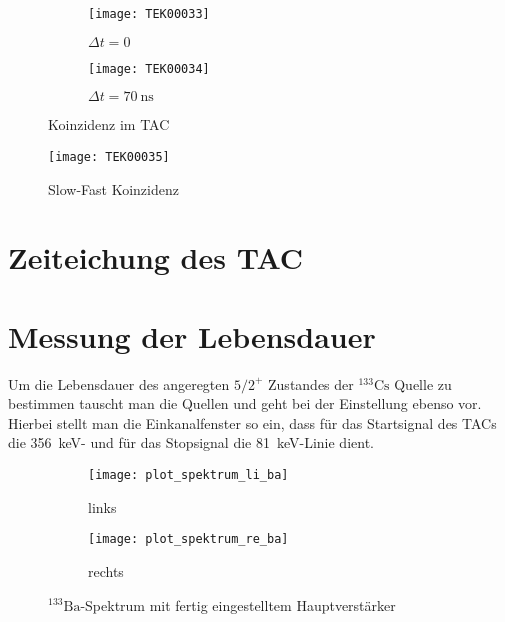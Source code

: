 \documentclass[11pt, ngerman, fleqn, DIV=15, headinclude, BCOR=2cm]{scrreprt}
\begin{document}
\begin{figure}
	\centering
	\begin{subfigure}{0.49 \textwidth}
		\texttt{[image: TEK00033]}
		\caption{%
			$\Delta t = 0$
		}
		\label{fig:fast_signal_tac_koinzidenz-t0}
	\end{subfigure}
	\begin{subfigure}{0.49 \textwidth}
		\texttt{[image: TEK00034]}
		\caption{%
			$\Delta t = \SI{70}{\nano\second}$
		}
		\label{fig:fast_signal_tac_koinzidenz-t5-16}
	\end{subfigure}
	\caption{%
		Koinzidenz im TAC
	}
	\label{fig:fast_signal_tac_koinzidenz}
\end{figure}

\begin{figure}
	\centering
	\texttt{[image: TEK00035]}
	\caption{%
		Slow-Fast Koinzidenz
	}
	\label{fig:slow_fast_koinzidenz}
\end{figure}

\section{Zeiteichung des TAC}
\fehlt%

\clearpage
\section{Messung der Lebensdauer}
Um die Lebensdauer des angeregten $5/2^+$ Zustandes der $^{133}\text{Cs}$
Quelle zu bestimmen tauscht man die Quellen und geht bei der Einstellung ebenso
vor. Hierbei stellt man die Einkanalfenster so ein, dass für das Startsignal
des TACs die \SI{356}{\kilo\electronvolt}- und für das Stopsignal
die \SI{81}{\kilo\electronvolt}-Linie dient.

\begin{figure}
	\centering
	\begin{subfigure}{0.49 \textwidth}
		\texttt{[image: plot\_spektrum\_li\_ba]}
		\caption{%
			links
		}
		\label{fig:ba_slow_hv_eingestellt-li_plot}
	\end{subfigure}
	\begin{subfigure}{0.49 \textwidth}
		\texttt{[image: plot\_spektrum\_re\_ba]}
		\caption{%
			rechts
		}
		\label{fig:ba_slow_hv_eingestellt-re_plot}
	\end{subfigure}
	\caption{%
		$^{133}\text{Ba}$-Spektrum mit fertig eingestelltem
		Hauptverstärker
	}
	\label{fig:ba_slow_signal_hv_eingestellt_plot}
\end{figure}
\end{document}
